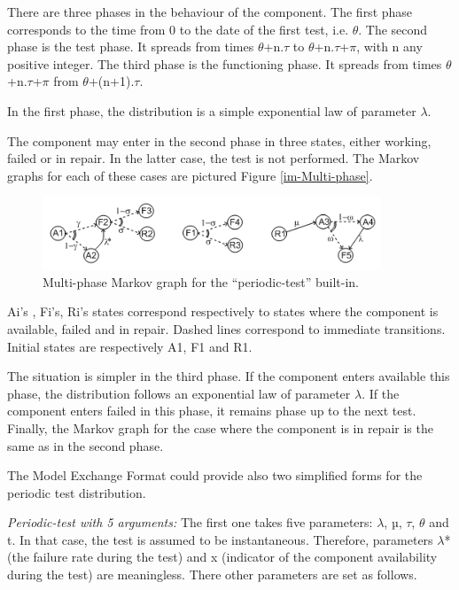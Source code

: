 \documentclass[11pt]{article}
\begin{document}
There are three phases in the behaviour of the component. The first
phase corresponds to the time from 0 to the date of the first test, i.e.
\(\theta\). The second phase is the test phase. It spreads from times \(\theta\)+n.\(\tau\) to
\(\theta\)+n.\(\tau\)+\(\pi\), with n any positive integer. The third phase is the functioning
phase. It spreads from times \(\theta\)+n.\(\tau\)+\(\pi\) from \(\theta\)+(n+1).\(\tau\).

In the first phase, the distribution is a simple exponential law of
parameter \(\lambda\).

The component may enter in the second phase in three states, either
working, failed or in repair. In the latter case, the test is not
performed. The Markov graphs for each of these cases are pictured Figure \ref{im-Multi-phase}.


\begin{figure}[htbp]

\includegraphics[width=0.9\textwidth]{./word/media/image8.png}
\caption{\label{fig:org842e743}
Multi-phase Markov graph for the ``periodic-test'' built-in.}
\end{figure}

Ai's , Fi's, Ri's states correspond respectively to states where the
component is available, failed and in repair. Dashed lines correspond to
immediate transitions. Initial states are respectively A1, F1 and R1.

The situation is simpler in the third phase. If the component enters
available this phase, the distribution follows an exponential law of
parameter \(\lambda\). If the component enters failed in this phase, it remains
phase up to the next test. Finally, the Markov graph for the case where
the component is in repair is the same as in the second phase.

The Model Exchange Format could provide also two simplified forms for
the periodic test distribution.

\emph{Periodic-test with 5 arguments:} The first one takes five parameters:
\(\lambda\), µ, \(\tau\), \(\theta\) and t. In that case, the test is assumed to be instantaneous.
Therefore, parameters \(\lambda\)* (the failure rate during the test) and x
(indicator of the component availability during the test) are
meaningless. There other parameters are set as follows.
\end{document}
